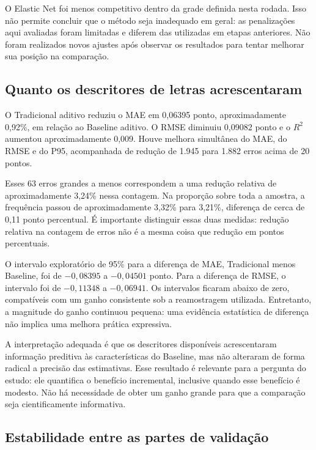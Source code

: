 O Elastic Net foi menos competitivo dentro da grade definida nesta rodada. Isso não permite concluir que o método seja inadequado em geral: as penalizações aqui avaliadas foram limitadas e diferem das utilizadas em etapas anteriores. Não foram realizados novos ajustes após observar os resultados para tentar melhorar sua posição na comparação.

\subsection{Quanto os descritores de letras acrescentaram}



O Tradicional aditivo reduziu o MAE em 0,06395 ponto, aproximadamente 0,92\%, em relação ao Baseline aditivo. O RMSE diminuiu 0,09082 ponto e o $R^2$ aumentou aproximadamente 0,009. Houve melhora simultânea do MAE, do RMSE e do P95, acompanhada de redução de 1.945 para 1.882 erros acima de 20 pontos.

Esses 63 erros grandes a menos correspondem a uma redução relativa de aproximadamente 3,24\% nessa contagem. Na proporção sobre toda a amostra, a frequência passou de aproximadamente 3,32\% para 3,21\%, diferença de cerca de 0,11 ponto percentual. É importante distinguir essas duas medidas: redução relativa na contagem de erros não é a mesma coisa que redução em pontos percentuais.

O intervalo exploratório de 95\% para a diferença de MAE, Tradicional menos Baseline, foi de $-0,08395$ a $-0,04501$ ponto. Para a diferença de RMSE, o intervalo foi de $-0,11348$ a $-0,06941$. Os intervalos ficaram abaixo de zero, compatíveis com um ganho consistente sob a reamostragem utilizada. Entretanto, a magnitude do ganho continuou pequena: uma evidência estatística de diferença não implica uma melhora prática expressiva.

A interpretação adequada é que os descritores disponíveis acrescentaram informação preditiva às características do Baseline, mas não alteraram de forma radical a precisão das estimativas. Esse resultado é relevante para a pergunta do estudo: ele quantifica o benefício incremental, inclusive quando esse benefício é modesto. Não há necessidade de obter um ganho grande para que a comparação seja cientificamente informativa.

\subsection{Estabilidade entre as partes de validação}


